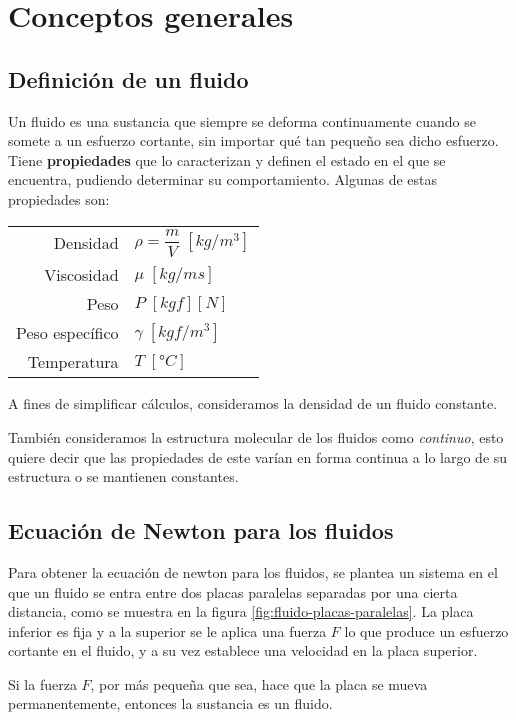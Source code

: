 \section{Conceptos generales}

\subsection{Definición de un fluido}
Un fluido es una sustancia que siempre se deforma continuamente cuando se somete a un esfuerzo cortante, sin importar qué tan pequeño sea dicho esfuerzo.\\

Tiene \textbf{propiedades} que lo caracterizan y definen el estado en el que se encuentra, pudiendo determinar su comportamiento. Algunas de estas propiedades son: \\
\begin{center}
	\begin{tabular} {r l}
		Densidad & $\rho = \dfrac{m}{V} \;[kg/m^3]$ \\
		Viscosidad & $\mu \;[kg/m s]$ \\
		Peso & $P \;[kgf] [N]$\\
		Peso específico & $\gamma \;[kgf/m^3]$ \\
		Temperatura & $T \;[°C]$ \\
	\end{tabular}
\end{center}

A fines de simplificar cálculos, consideramos la densidad de un fluido constante.

También consideramos la estructura molecular de los fluidos como \emph{continuo}, esto quiere decir que las propiedades de este varían en forma continua a lo largo de su estructura o se mantienen constantes.


\subsection{Ecuación de Newton para los fluidos}
Para obtener la ecuación de newton para los fluidos, se plantea un sistema en el que un fluido se entra entre dos placas paralelas separadas por una cierta distancia, como se muestra en la figura \ref{fig:fluido-placas-paralelas}. La placa inferior es fija y a la superior se le aplica una fuerza $F$ lo que produce un esfuerzo cortante en el fluido, y a su vez establece una velocidad en la placa superior.

Si la fuerza $F$, por más pequeña que sea, hace que la placa se mueva permanentemente, entonces la sustancia es un fluido.

